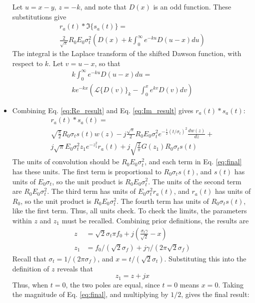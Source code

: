 \documentclass[amsmath,amssymb,aps,prd,10pt,twocolumn,showkeys]{revtex4}
\begin{document}
\begin{itemize}
Let $u = x-y$, $z=-k$, and note that $D(x)$ is an odd function.  These substitutions give
\begin{multline}
r_a(t) * \Im\lbrace s_a(t) \rbrace = \\ \frac{2}{\sqrt{\pi}} R_0 E_0 \sigma_t^2 \left(D(x) + k\int_{0}^{\infty} e^{-ku} D(u-x) du \right)
\end{multline}
The integral is the Laplace transform of the shifted Dawson function, with respect to $k$.  Let $v = u-x$, so that
\begin{multline}
k\int_{0}^{\infty} e^{-ku} D(u-x) du = \\ k e^{-kx} \left( \mathcal{L}\lbrace D(v) \rbrace_k - \int_0^{x} e^{kv} D(v) dv\right)
\end{multline}
\item Combining Eq. \ref{eq:Re_result} and Eq. \ref{eq:Im_result} gives $r_a(t) * s_a(t)$:
\begin{multline}
r_a(t) * s_a(t) = \\
\sqrt{\frac{\pi}{2}}R_0 \sigma_t s(t) w(z) - j\frac{\sqrt{\pi}}{2} R_0 E_0 \sigma_t^2 e^{-\frac{1}{2}(t/\sigma_t)^2} \frac{dw(z)}{dz} + \\
j\sqrt{\pi}E_0 \sigma_t^2 z_1 e^{-z_1^2}r_a(t) + j\sqrt{\frac{2}{\pi}} G(z_1) R_0 \sigma_t s(t) \label{eq:final}
\end{multline}
The units of convolution should be $R_0 E_0\sigma_t^2$, and each term in Eq. \ref{eq:final} has these units.  The first term is proportional to $R_0 \sigma_t s(t)$, and $s(t)$ has units of $E_0 \sigma_t$, so the unit product is $R_0 E_0\sigma_t^2$.  The units of the second term are $R_0 E_0\sigma_t^2$.  The third term has units of $E_0\sigma_t^2 r_a(t)$, and $r_a(t)$ has units of $R_0$, so the unit product is $R_0 E_0\sigma_t^2$.  The fourth term has units of $R_0 \sigma_t s(t)$, like the first term.  Thus, all units check.  To check the limits, the parameters within $z$ and $z_1$ must be recalled.  Combining prior definitions, the results are
\begin{align}
z &= \sqrt{2}\sigma_t \pi f_0 + j\left(\frac{\sigma_t\gamma}{\sqrt{2}} - x\right) \\
z_1 &= f_0/(\sqrt{2}\sigma_f) + j\gamma/(2\pi \sqrt{2} \sigma_f)
\end{align}
Recall that $\sigma_t = 1/(2\pi \sigma_f)$, and $x=t/(\sqrt{2}\sigma_t)$.  Substituting this into the definition of $z$ reveals that
\begin{equation}
z_1 = z + jx
\end{equation}
Thus, when $t=0$, the two poles are equal, since $t=0$ means $x=0$.  Taking the magnitude of Eq. \ref{eq:final}, and multiplying by $1/2$, gives the final result:

\end{itemize}
\end{document}
